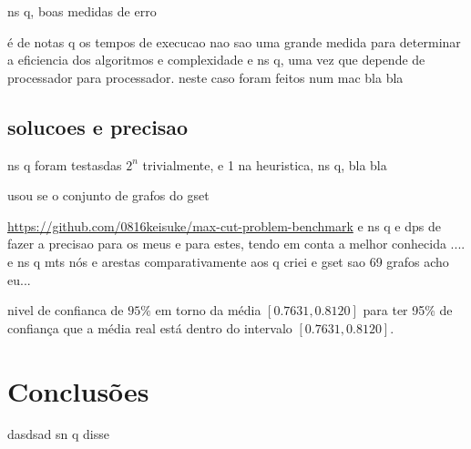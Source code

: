 \documentclass[mirror]{revdetua}
\begin{document}
ns q, boas medidas de erro

é de notas q os tempos de execucao nao sao uma grande medida para determinar a eficiencia dos algoritmos e complexidade e ns q, uma vez que depende de processador para processador. neste caso foram feitos num mac bla bla


\subsection{solucoes e precisao}

ns q foram testasdas $2^n$ trivialmente, e 1 na heuristica, ns q, bla bla

usou se o conjunto de grafos do gset

\url{https://github.com/0816keisuke/max-cut-problem-benchmark} e ns q e dps de fazer a precisao para os meus e para estes, tendo em conta a melhor conhecida .... e ns q mts nós e arestas comparativamente aos q criei e gset sao 69 grafos acho eu...

nivel de confianca de $95\%$ em torno da média $[0.7631, 0.8120]$ para ter 95\% de confiança que a média real está dentro do intervalo $[0.7631, 0.8120]$.


\section{Conclusões}

dasdsad sn q disse


\end{document}
